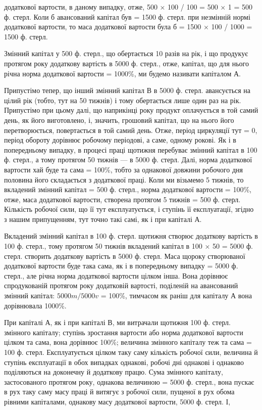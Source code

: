 \parcont{}  %
додаткової вартости, в даному випадку, отже, 500 × 100 / 100 = 500 × 1 = 500 ф. стерл. Коли б
авансований капітал був = 1500 ф. стерл. при незмінній
нормі додаткової вартости, то маса додаткової вартости була б =
1500 × 100 / 1000 = 1500 ф. стерл.

Змінний капітал у 500 ф. стерл., що обертається 10 разів на рік, і
що продукує протягом року додаткову вартість в 5000 ф. стерл., отже,
капітал, що для нього річна норма додаткової вартости = 1000\%, ми
будемо називати капіталом А.

Припустімо тепер, що інший змінний капітал В в 5000 ф. стерл.
авансується на цілий рік (тобто, тут на 50 тижнів) і тому обертається
лише один раз на рік. Припустімо при цьому далі, що наприкінці року
продукт оплачується в той самий день, як його виготовлено, і, значить,
грошовий капітал, що на нього його перетворюється, повертається в той
самий день. Отже, період циркуляції тут = 0, період обороту дорівнює
робочому періодові, а саме, одному рокові. Як і в попередньому випадку,
в процесі праці щотижня перебуває змінний капітал в 100 ф. стерл.,
а тому протягом 50 тижнів — в 5000 ф. стерл. Далі, норма додаткової
вартости хай буде та сама = 100\%, тобто за однакової довжини робочого
дня половина його складається з додаткової праці. Коли ми візьмемо
5 тижнів, то вкладений змінний капітал = 500 ф. стерл., норма додаткової
вартости = 100\%, отже, маса додаткової вартости, створена протягом
5 тижнів = 500 ф. стерл. Кількість робочої сили, що її тут експлуатується,
і ступінь її експлуатації, згідно з нашим припущенням, тут
точно такі самі, як і при капіталі А.

Вкладений змінний капітал в 100 ф. стерл. щотижня створює додаткову
вартість в 100 ф. стерл., тому протягом 50 тижнів вкладений капітал
в 100 × 50 = 5000 ф. стерл. створить додаткову вартість в 5000 ф. стерл. Маса щороку створюваної
додаткової вартости буде така сама, як і в попередньому випадку = 5000 ф. стерл., але річна норма
додаткової
вартости цілком інша. Вона дорівнює спродукованій протягом року
додатковій вартості, поділеній на авансований змінний капітал:
$5000 m / 5000 v$ = 100\%, тимчасом як раніш для капіталу А вона дорівнювала 1000\%.

При капіталі А, як і при капіталі В, ми витрачали щотижня 100 ф. стерл. змінного капіталу; ступінь
зростання вартости або норма додаткової
вартости цілком та сама, вона дорівнює 100\%; величина змінного
капіталу теж та сама = 100 ф. стерл. Експлуатується цілком таку
саму кількість робочої сили, величина й ступінь експлуатації в обох випадках
однакові, робочі дні однакові і однаково поділяються на доконечну
й додаткову працю. Сума змінного капіталу, застосованого протягом
року, однакова величиною = 5000 ф. стерл., вона пускає в рух таку
саму масу праці й витягує з робочої сили, пущеної в рух обома рівними
капіталами, однакову масу додаткової вартости, 5000 ф. стерл. І,
\parbreak{}  %
